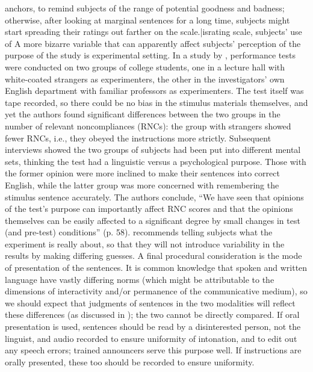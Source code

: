  anchors, to remind subjects of the range of potential goodness and badness; otherwise, after looking at marginal sentences for a long time, subjects might start spreading their ratings out farther on the scale.|is{rating scale, subjects' use of} A more bizarre variable that can apparently affect subjects' perception of the purpose of the study is experimental setting. In a study by \citet{GreenbaumEtAl1970}, performance tests were conducted on two groups of college students, one in a lecture hall with white-coated strangers as experimenters, the other in the investigators' own English department with familiar professors as experimenters. The test itself was tape recorded, so there could be no bias in the stimulus materials themselves, and yet the authors found significant differences between the two groups in the number of relevant noncompliances (RNCs): the group with strangers showed fewer RNCs, i.e., they obeyed the instructions more strictly. Subsequent interviews showed the two groups of subjects had been put into different mental sets, thinking the test had a linguistic versus a psychological purpose. Those with the former opinion were more inclined to make their sentences into correct English, while the latter group was more concerned with remembering the stimulus sentence accurately. The authors conclude, ``We have seen that opinions of the test's purpose can importantly affect RNC scores and that the opinions themselves can be easily affected to a significant degree by small changes in test (and pre-test) conditions'' (p. 58). \citet{Greenbaum1977c} recommends telling subjects what the experiment is really about, so that they will not introduce variability in the results by making differing guesses. A final procedural consideration is the mode of presentation of the sentences. It is common knowledge that spoken and written language have vastly differing norms (which might be attributable to the dimensions of interactivity and/or permanence of the communicative medium), so we should expect that judgments of sentences in the two modalities will reflect these differences (as discussed in ); the two cannot be directly compared. If oral presentation is used, sentences should be read by a disinterested person, not the linguist, and audio recorded to ensure uniformity of intonation, and to edit out any speech errors; trained announcers serve this purpose well. If instructions are orally presented, these too should be recorded to ensure uniformity.

